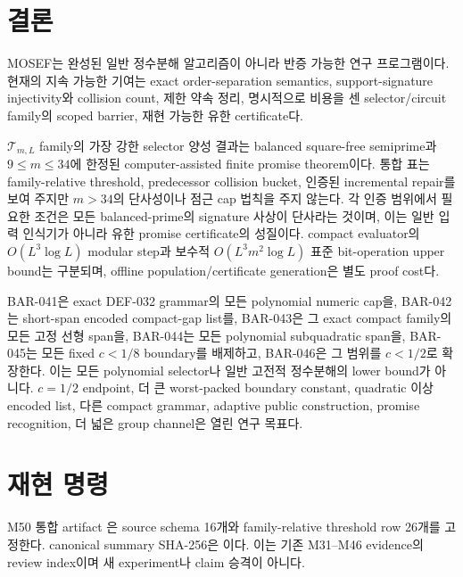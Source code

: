 \documentclass[11pt]{article}
\begin{document}
\section{결론}

MOSEF는 완성된 일반 정수분해 알고리즘이 아니라 반증 가능한 연구
프로그램이다. 현재의 지속 가능한 기여는 exact order-separation
semantics, support-signature injectivity와 collision count, 제한 약속
정리, 명시적으로 비용을 센 selector/circuit family의 scoped barrier,
재현 가능한 유한 certificate다.

\(\mathcal T_{m,L}\) family의 가장 강한 selector 양성 결과는 balanced
square-free semiprime과 \(9\le m\le34\)에 한정된
computer-assisted finite promise theorem이다. 통합 표는
family-relative threshold, predecessor collision bucket, 인증된
incremental repair를 보여 주지만 \(m>34\)의 단사성이나 점근 cap
법칙을 주지 않는다. 각 인증 범위에서 필요한 조건은 모든
balanced-prime의 signature 사상이 단사라는 것이며, 이는 일반 입력
인식기가 아니라 유한 promise certificate의 성질이다. compact
evaluator의 \(O(L^3\log L)\) modular
step과 보수적 \(O(L^3m^2\log L)\) 표준 bit-operation upper bound는
구분되며, offline population/certificate generation은 별도 proof
cost다.

BAR-041은 exact DEF-032 grammar의 모든 polynomial numeric cap을,
BAR-042는 short-span encoded compact-gap list를, BAR-043은 그 exact
compact family의 모든 고정 선형 span을, BAR-044는 모든 polynomial
subquadratic span을, BAR-045는 모든 fixed \(c<1/8\) boundary를
배제하고, BAR-046은 그 범위를 \(c<1/2\)로 확장한다. 이는 모든 polynomial selector나 일반
고전적 정수분해의 lower bound가 아니다.
\(c=1/2\) endpoint, 더 큰 worst-packed boundary constant, quadratic 이상 encoded list, 다른
compact grammar, adaptive public construction, promise recognition,
더 넓은 group channel은 열린 연구 목표다.


\section{재현 명령}

M50 통합 artifact
은 source schema
16개와 family-relative threshold row 26개를 고정한다. canonical
summary SHA-256은
\texttt{}
이다. 이는 기존 M31--M46 evidence의 review index이며 새 experiment나
claim 승격이 아니다.
\end{document}
